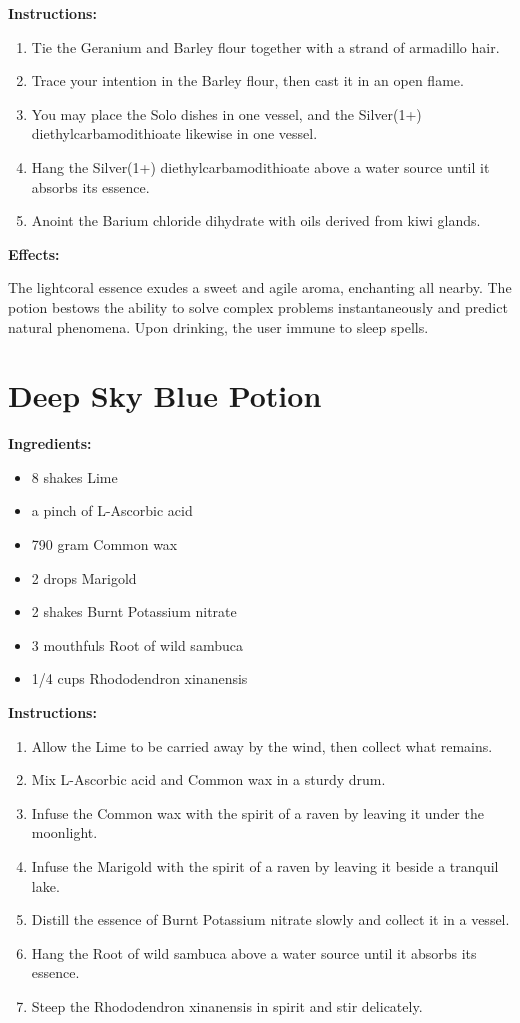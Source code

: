 \documentclass{article}
\begin{document}
\textbf{Instructions:}

\begin{enumerate}
  \item Tie the Geranium and Barley flour together with a strand of armadillo hair.
  \item Trace your intention in the Barley flour, then cast it in an open flame.
  \item You may place the Solo dishes in one vessel, and the Silver(1+) diethylcarbamodithioate likewise in one vessel.
  \item Hang the Silver(1+) diethylcarbamodithioate above a water source until it absorbs its essence.
  \item Anoint the Barium chloride dihydrate with oils derived from kiwi glands.
\end{enumerate}

\textbf{Effects:}

The lightcoral essence exudes a sweet and agile aroma, enchanting all nearby. The potion bestows the ability to solve complex problems instantaneously and predict natural phenomena. Upon drinking, the user immune to sleep spells.

\newpage
\section*{Deep Sky Blue Potion}

\textbf{Ingredients:}

\begin{itemize}
  \item 8 shakes Lime
  \item a pinch of L-Ascorbic acid
  \item 790 gram Common wax
  \item 2 drops Marigold
  \item 2 shakes Burnt Potassium nitrate
  \item 3 mouthfuls Root of wild sambuca
  \item 1/4 cups Rhododendron xinanensis
\end{itemize}

\textbf{Instructions:}

\begin{enumerate}
  \item Allow the Lime to be carried away by the wind, then collect what remains.
  \item Mix L-Ascorbic acid and Common wax in a sturdy drum.
  \item Infuse the Common wax with the spirit of a raven by leaving it under the moonlight.
  \item Infuse the Marigold with the spirit of a raven by leaving it beside a tranquil lake.
  \item Distill the essence of Burnt Potassium nitrate slowly and collect it in a vessel.
  \item Hang the Root of wild sambuca above a water source until it absorbs its essence.
  \item Steep the Rhododendron xinanensis in spirit and stir delicately.
\end{enumerate}
\end{document}
